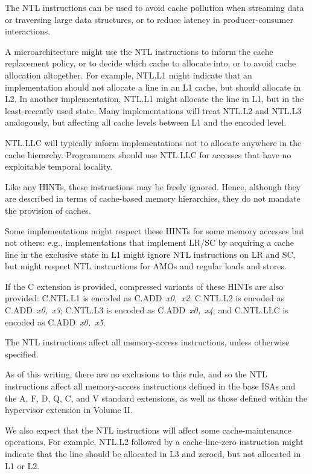\begin{commentary}
The NTL instructions can be used to avoid cache pollution when streaming data
or traversing large data structures, or to reduce latency in producer-consumer
interactions.

A microarchitecture might use the NTL instructions to inform the cache
replacement policy, or to decide which cache to allocate into, or to avoid
cache allocation altogether.
For example, NTL.L1 might indicate that an implementation should not allocate
a line in an L1 cache, but should allocate in L2.
In another implementation, NTL.L1 might allocate the line in L1, but in
the least-recently used state.
Many implementations will treat NTL.L2 and NTL.L3 analogously, but affecting
all cache levels between L1 and the encoded level.

NTL.LLC will typically inform implementations not to allocate anywhere in the
cache hierarchy.
Programmers should use NTL.LLC for accesses that have no exploitable temporal
locality.

Like any HINTs, these instructions may be freely ignored.
Hence, although they are described in terms of cache-based memory hierarchies,
they do not mandate the provision of caches.

Some implementations might respect these HINTs for some memory accesses but
not others: e.g., implementations that implement LR/SC by acquiring a
cache line in the exclusive state in L1 might ignore NTL instructions
on LR and SC, but might respect NTL instructions for
AMOs and regular loads and stores.
\end{commentary}

If the C extension is provided, compressed variants of these HINTs are also
provided:
C.NTL.L1 is encoded as \mbox{C.ADD {\em x0, x2}};
C.NTL.L2 is encoded as \mbox{C.ADD {\em x0, x3}};
C.NTL.L3 is encoded as \mbox{C.ADD {\em x0, x4}};
and C.NTL.LLC is encoded as \mbox{C.ADD {\em x0, x5}}.

The NTL instructions affect all memory-access instructions, unless otherwise
specified.

\begin{commentary}
As of this writing, there are no exclusions to this rule, and so
the NTL instructions affect all memory-access instructions
defined in the base ISAs and the A, F, D, Q, C, and V standard extensions,
as well as those defined within the hypervisor extension in Volume II.

We also expect that the NTL instructions will affect some cache-maintenance
operations.
For example, NTL.L2 followed by a cache-line-zero instruction might indicate
that the line should be allocated in L3 and zeroed, but not allocated in
L1 or L2.
\end{commentary}

